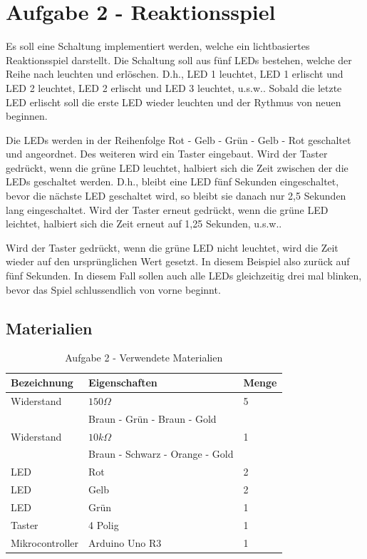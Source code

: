
\section{Aufgabe 2 - Reaktionsspiel}
\label{sec:aufgabe-2---reaktionsspiel}

Es soll eine Schaltung implementiert werden, welche ein lichtbasiertes Reaktionsspiel darstellt.
Die Schaltung soll aus fünf LEDs bestehen, welche der Reihe nach leuchten und erlöschen.
D.h., LED 1 leuchtet, LED 1 erlischt und LED 2 leuchtet, LED 2 erlischt und LED 3 leuchtet, u.s.w..
Sobald die letzte LED erlischt soll die erste LED wieder leuchten und der Rythmus von neuen beginnen.

Die LEDs werden in der Reihenfolge Rot - Gelb - Grün - Gelb - Rot geschaltet und angeordnet.
Des weiteren wird ein Taster eingebaut.
Wird der Taster gedrückt, wenn die grüne LED leuchtet, halbiert sich die Zeit zwischen der die LEDs geschaltet werden.
D.h., bleibt eine LED fünf Sekunden eingeschaltet, bevor die nächste LED geschaltet wird, so bleibt sie danach nur 2,5 Sekunden lang eingeschaltet.
Wird der Taster erneut gedrückt, wenn die grüne LED leichtet, halbiert sich die Zeit erneut auf 1,25 Sekunden, u.s.w..

Wird der Taster gedrückt, wenn die grüne LED nicht leuchtet, wird die Zeit wieder auf den ursprünglichen Wert gesetzt.
In diesem Beispiel also zurück auf fünf Sekunden.
In diesem Fall sollen auch alle LEDs gleichzeitig drei mal blinken, bevor das Spiel schlussendlich von vorne beginnt.

\subsection{Materialien}
\label{subsec:a2-materialien}

\begin{table}[h]
    \centering
    \caption{Aufgabe 2 - Verwendete Materialien}
    \label{tab:a2-materialien}
    \begin{tabular}{| l | l | l |}
        \hline
        Bezeichnung & Eigenschaften & Menge \\
        \hline
        Widerstand  & $150\Omega$   & 5     \\
        & Braun - Grün - Braun - Gold & \\
        Widerstand & $10k\Omega$ & 1 \\
        & Braun - Schwarz - Orange - Gold & \\
        LED & Rot & 2 \\
        LED & Gelb & 2 \\
        LED & Grün & 1 \\
        Taster & 4 Polig & 1 \\
        Mikrocontroller & Arduino Uno R3 & 1 \\
        \hline
    \end{tabular}
\end{table}

